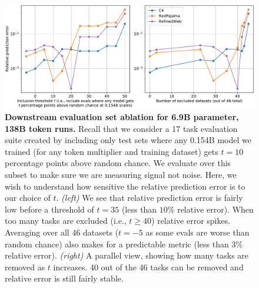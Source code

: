 \begin{appendix}
\begin{figure}[tp]
    \centering
    \includegraphics[width=\linewidth]{figs/eval_ablation.pdf}
    \caption{
    \textbf{Downstream evaluation set ablation for 6.9B parameter, 138B token runs.}
    Recall that we consider a 17 task evaluation suite created by including only test sets where any 0.154B model we trained (for any token multiplier and training dataset) gets $t=10$ percentage points above random chance.
    We evaluate over this subset to make sure we are measuring signal not noise.
    Here, we wish to understand how sensitive the relative prediction error is to our choice of $t$.
    \emph{(left)}
    We see that relative prediction error is fairly low before a threshold of $t=35$ (less than $10\%$ relative error).
    When too many tasks are excluded (i.e., $t\geq 40$) relative error spikes.
    Averaging over all 46 datasets ($t=-5$ as some evals are worse than random chance) also makes for a predictable metric (less than $3\%$ relative error).
    \emph{(right)}
    A parallel view, showing how many tasks are removed as $t$ increases.
    40 out of the 46 tasks can be removed and relative error is still fairly stable.
    }
    \label{fig:eval_ablation}
\end{figure}


\end{appendix}
